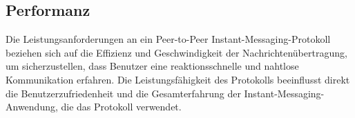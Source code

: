 \subsection{Performanz}

Die Leistungsanforderungen an ein Peer-to-Peer Instant-Messaging-Protokoll beziehen sich auf die Effizienz und Geschwindigkeit der Nachrichtenübertragung, um sicherzustellen, dass Benutzer eine reaktionsschnelle und nahtlose Kommunikation erfahren. Die Leistungsfähigkeit des Protokolls beeinflusst direkt die Benutzerzufriedenheit und die Gesamterfahrung der Instant-Messaging-Anwendung, die das Protokoll verwendet. 
